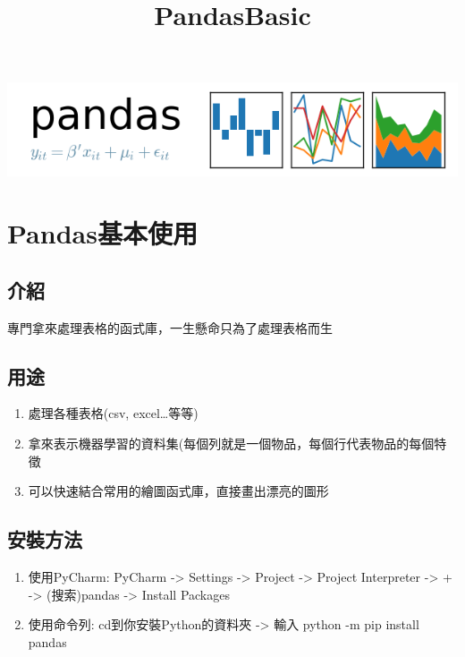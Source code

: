 \documentclass[11pt]{ctexart}
\title{PandasBasic}
\makeatletter
\def\maxwidth{\ifdim\Gin@nat@width>\linewidth\linewidth
    \else\Gin@nat@width\fi}
\let\Oldincludegraphics\includegraphics
\renewcommand{\includegraphics}[1]{\Oldincludegraphics[width=.8\maxwidth]{#1}}
\providecommand{\tightlist}{%
      \setlength{\itemsep}{0pt}\setlength{\parskip}{0pt}}
\makeatother
\begin{document}
    
    
    \maketitle
    
    

    
    \includegraphics{pandas_logo.png}

\hypertarget{pandasux57faux672cux4f7fux7528}{%
\section{Pandas基本使用}\label{pandasux57faux672cux4f7fux7528}}

\hypertarget{ux4ecbux7d39}{%
\subsection{介紹}\label{ux4ecbux7d39}}

專門拿來處理表格的函式庫，一生懸命只為了處理表格而生

\hypertarget{ux7528ux9014}{%
\subsection{用途}\label{ux7528ux9014}}

\begin{enumerate}
\def\labelenumi{\arabic{enumi}.}
\tightlist
\item
  處理各種表格(csv, excel\ldots{}等等)
\item
  拿來表示機器學習的資料集(每個列就是一個物品，每個行代表物品的每個特徵
\item
  可以快速結合常用的繪圖函式庫，直接畫出漂亮的圖形
\end{enumerate}

\hypertarget{ux5b89ux88ddux65b9ux6cd5}{%
\subsection{安裝方法}\label{ux5b89ux88ddux65b9ux6cd5}}

\begin{enumerate}
\def\labelenumi{\arabic{enumi}.}
\tightlist
\item
  使用PyCharm: PyCharm -\textgreater{} Settings -\textgreater{} Project
  -\textgreater{} Project Interpreter -\textgreater{} + -\textgreater{}
  (搜索)pandas -\textgreater{} Install Packages
\item
  使用命令列: cd到你安裝Python的資料夾 -\textgreater{} 輸入 python -m
  pip install pandas
\end{enumerate}
\end{document}
